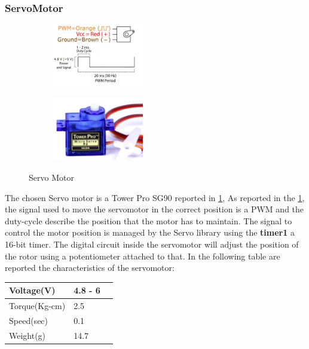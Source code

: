 \subsubsection{ServoMotor}
	\begin{figure}[h]
		\centering
		\begin{subfigure}{0.4\textwidth} %
			\includegraphics[width=4cm,keepaspectratio]{img/servo_signal}
			\end{subfigure}
		\vspace{1em} %
		\begin{subfigure}{0.4\textwidth} %
			\includegraphics[width=4cm,keepaspectratio]{img/servomotor}
		\end{subfigure}
		\caption{Servo Motor}
		\label{fig:ServoMotor}
	\end{figure}

	The chosen Servo motor is a Tower Pro SG90 reported in \ref{fig:ServoMotor},
	As reported in the \ref{fig:ServoMotor}, the signal used to move the servomotor in the correct position is a PWM and the duty-cycle describe the position that the motor has to maintain.
	The signal to control the motor position is managed by the Servo library using the \textbf{timer1} a 16-bit timer.
	The digital circuit inside the servomotor will adjust the position of the rotor using a potentiometer attached to that.
	In the following table are reported	the characteristics of the servomotor:
	\begin{center}
		\begin{tabular}{||l | l | l||} 
			\hline
			Voltage(V) & 4.8 - 6 \\ 
			\hline
			Torque(Kg-cm) & 2.5 \\
			\hline
			Speed(sec) & 0.1 \\
			\hline
			Weight(g) & 14.7 \\
			\hline
		\end{tabular}
	\end{center}	

